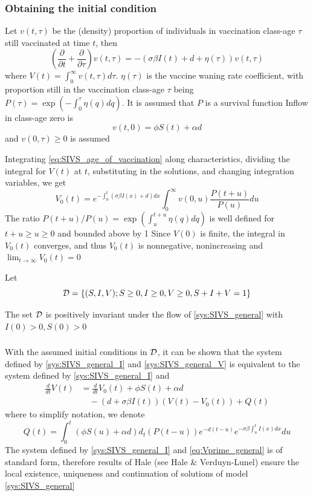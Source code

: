 \documentclass[aspectratio=169]{beamer}\usepackage[]{graphicx}\usepackage[]{xcolor}
\begin{document}
\begin{frame}\frametitle{Obtaining the initial condition}
Let $v(t,\tau)$ be the (density) proportion of individuals in vaccination class-age $\tau$ still vaccinated at time $t$,
then
\begin{equation}\label{eq:SIVS_age_of_vaccination}
\left(\frac{\partial}{\partial t}+\frac{\partial}{\partial\tau}\right)
v(t,\tau)=
-(\sigma\beta I(t)+d+\eta(\tau))v(t,\tau)
\end{equation}
where $V(t)=\int_0^\infty v(t,\tau)d\tau$. $\eta(\tau)$ is the vaccine waning rate coefficient, with proportion still in the vaccination class-age $\tau$ being $P(\tau)=\exp\left(-\int_0^\tau\eta(q)dq\right)$.
It is assumed that $P$ is a survival function
\vfill
Inflow in class-age zero is 
\[
v(t,0)=\phi S(t)+\alpha d
\]
and $v(0,\tau)\geq 0$ is assumed
\end{frame}

\begin{frame}
Integrating \eqref{eq:SIVS_age_of_vaccination} along characteristics, dividing the integral for $V(t)$ at $t$, substituting in the solutions, and changing integration variables, we get
\begin{equation}
V_0(t)=e^{-\int_0^t(\sigma\beta I(x)+d)dx} \int_0^\infty
v(0,u)\frac{P(t+u)}{P(u)}du 
\label{eq:V0}
\end{equation}
The ratio $P(t+u)/P(u)=\exp\left(\int_u^{t+u}\eta(q)dq\right)$ is well defined for $t+u\geq u\geq 0$ and bounded above by 1
\vfill
Since $V(0)$ is finite, the integral in $V_0(t)$ converges, and thus $V_0(t)$ is nonnegative,
nonincreasing and $\lim_{t\to\infty}V_0(t)=0$
\end{frame}

\begin{frame}
Let
\[
\mathcal{D}=\{
(S,I,V); S\geq 0, I\geq 0, V\geq 0, S+I+V=1
\}
\]
\vfill
\begin{theorem}
The set $\mathcal{D}$ is positively invariant under the flow of \eqref{sys:SIVS_general} with $I(0)>0, S(0)>0$
\label{th:invariance_gen_model}
\end{theorem}
\end{frame}


\begin{frame}\frametitle{}
With the assumed initial conditions in $\mathcal{D}$, it can be shown that the system defined by \eqref{sys:SIVS_general_I} and \eqref{sys:SIVS_general_V} is equivalent to the system defined by \eqref{sys:SIVS_general_I} and
\begin{align}
\frac{d}{dt}V(t) &= \frac{d}{dt}V_0(t)+\phi S(t)+\alpha d \label{eq:Vprime_general} \\
&\quad -(d+\sigma\beta I(t))(V(t)-V_0(t)) 
+ Q(t)\nonumber
\end{align}
where to simplify notation, we denote
\[
Q(t)=\int_0^t (\phi S(u)+\alpha d) d_t(P(t-u))e^{-d(t-u)}
e^{-\sigma\beta\int_u^t I(x)dx}du
\]
\vfill
The system defined by \eqref{sys:SIVS_general_I} and \eqref{eq:Vprime_general} is of standard form, therefore results of Hale (see Hale \& Verduyn-Lunel) ensure the local existence, uniqueness and continuation of solutions of model \eqref{sys:SIVS_general}
\end{frame}
\end{document}

